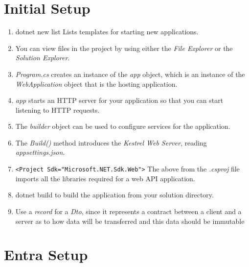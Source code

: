 \documentclass[12pt]{report}
\title{}
\author{Justin K}
\date{\today} %
\begin{document}
\maketitle
\tableofcontents
\begin{flushleft}


\section{Initial Setup}

\begin{enumerate}
\item  dotnet new list 
\newline
Lists templates for starting new applications.
\item  You can view files in the project by using either the \emph{File Explorer} or the \emph{Solution Explorer}.
\item \emph{Program.cs} creates an instance of the \emph{app} object, which is an instance of the \emph{WebApplication} object that is the hosting application.
\item \emph{app} starts an HTTP server for your application so that you can start listening to HTTP requests.
\item The \emph{builder} object can be used to configure services for the application.
\item The \emph{Build()} method introduces the \emph{Kestrel Web Server}, reading \emph{appsettings.json}.
\item \verb|<Project Sdk="Microsoft.NET.Sdk.Web">|
\newline
The above from the \emph{.csproj} file imports all the libraries required for a web API application.
\item dotnet build
\newline
to build the application from your solution directory.
\item Use a \emph{record} for a \emph{Dto}, since it represents a contract between a client and a server as to how data will be transferred and this data should be immutable
\newline

\end{enumerate}

\section{Entra Setup}


\end{flushleft}
\end{document}
